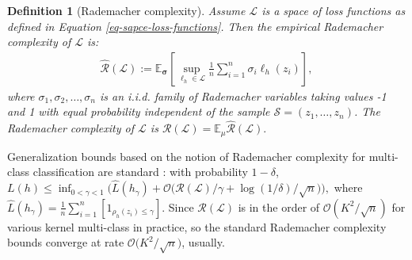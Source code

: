 \documentclass{article}
\newtheorem{definition}{Definition}
\begin{document}
\begin{definition}[Rademacher complexity]
Assume $\mathcal{L}$ is a space of loss functions as defined in Equation \eqref{eq-sapce-loss-functions}.
Then the empirical Rademacher complexity of $\mathcal{L}$ is:
    \begin{align*}
      \hat{\mathcal{R}}(\mathcal{L}):=\mathbb{E}_{\bm \sigma}
      \left[\sup_{\ell_h\in\mathcal{L}}
     \frac{1}{n}\sum_{i=1}^n\sigma_i \ell_{h}(z_i)
          \right],
    \end{align*}
     where $\sigma_1,\sigma_2, \ldots,\sigma_n$
    is an i.i.d. family of Rademacher variables taking values -1 and 1
    with equal probability independent of the sample $\mathcal{S}=(z_1,\ldots,z_n)$.
    The  Rademacher complexity of $\mathcal{L}$ is
    $
      \mathcal{R}(\mathcal{L})=\mathbb{E}_{\mu}\hat{\mathcal{R}}(\mathcal{L}).
   $
\end{definition}
Generalization bounds based on the notion of Rademacher complexity for multi-class classification
are standard \cite{koltchinskii2002empirical,koltchinskii2001some,mohri2012foundations}:
with probability $1-\delta$,
$
  L(h)\leq \inf_{0<\gamma<1}\big(\hat{L}(h_\gamma)+\mathcal{O}\big({\mathcal{R}(\mathcal{L})}/{\gamma}+{\log(1/\delta)}/{\sqrt{n}}\big)\big),
$
where $\hat{L}(h_\gamma)=\frac{1}{n}\sum_{i=1}^n\left[1_{\rho_h(z_i)\leq \gamma}\right]$.
Since $\mathcal{R}(\mathcal{L})$ is in the order of $\mathcal{O}({K^2}/{\sqrt{n}})$ for various  kernel multi-class in practice,
so the standard Rademacher complexity bounds converge at rate
$\mathcal{O}\big({K^2}/{\sqrt{n}}\big)$, usually.
\end{document}

